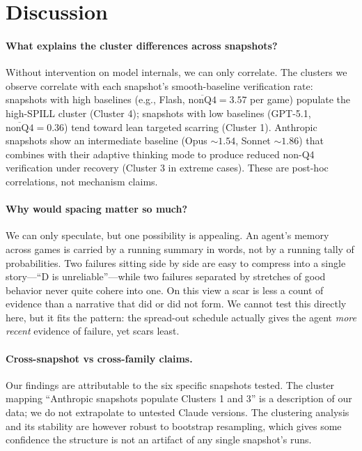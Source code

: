 \documentclass{article}
\begin{document}
\section{Discussion}
\label{sec:discussion}

\paragraph{What explains the cluster differences across snapshots?} Without intervention on model internals, we can only correlate. The clusters we observe correlate with each snapshot's smooth-baseline verification rate: snapshots with high baselines (e.g., Flash, $\overline{\mathrm{nonQ4}}=3.57$ per game) populate the high-SPILL cluster (Cluster 4); snapshots with low baselines (GPT-5.1, $\overline{\mathrm{nonQ4}}=0.36$) tend toward lean targeted scarring (Cluster 1). Anthropic snapshots show an intermediate baseline (Opus $\sim 1.54$, Sonnet $\sim 1.86$) that combines with their adaptive thinking mode to produce reduced non-Q4 verification under recovery (Cluster 3 in extreme cases). These are post-hoc correlations, not mechanism claims.

\paragraph{Why would spacing matter so much?} We can only speculate, but one possibility is appealing. An agent's memory across games is carried by a running summary in words, not by a running tally of probabilities. Two failures sitting side by side are easy to compress into a single story---``D is unreliable''---while two failures separated by stretches of good behavior never quite cohere into one. On this view a scar is less a count of evidence than a narrative that did or did not form. We cannot test this directly here, but it fits the pattern: the spread-out schedule actually gives the agent \emph{more recent} evidence of failure, yet scars least.

\paragraph{Cross-snapshot vs cross-family claims.} Our findings are attributable to the six specific snapshots tested. The cluster mapping ``Anthropic snapshots populate Clusters 1 and 3'' is a description of our data; we do not extrapolate to untested Claude versions. The clustering analysis and its stability are however robust to bootstrap resampling, which gives some confidence the structure is not an artifact of any single snapshot's runs.
\end{document}

